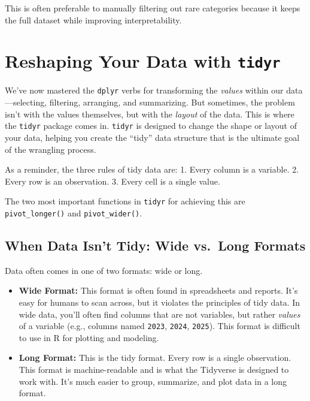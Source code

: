 \documentclass[
  11pt,
]{article}
\begin{document}
This is often preferable to manually filtering out rare categories
because it keeps the full dataset while improving interpretability.

\section{\texorpdfstring{Reshaping Your Data with
\texttt{tidyr}}{Reshaping Your Data with tidyr}}\label{reshaping-your-data-with-tidyr}

We've now mastered the \texttt{dplyr} verbs for transforming the
\emph{values} within our data---selecting, filtering, arranging, and
summarizing. But sometimes, the problem isn't with the values
themselves, but with the \emph{layout} of the data. This is where the
\texttt{tidyr} package comes in. \texttt{tidyr} is designed to change
the shape or layout of your data, helping you create the ``tidy'' data
structure that is the ultimate goal of the wrangling process.

As a reminder, the three rules of tidy data are: 1. Every column is a
variable. 2. Every row is an observation. 3. Every cell is a single
value.

The two most important functions in \texttt{tidyr} for achieving this
are \texttt{pivot\_longer()} and \texttt{pivot\_wider()}.

\subsection{When Data Isn't Tidy: Wide vs.~Long
Formats}\label{when-data-isnt-tidy-wide-vs.-long-formats}

Data often comes in one of two formats: wide or long.

\begin{itemize}
\item
  \textbf{Wide Format:} This format is often found in spreadsheets and
  reports. It's easy for humans to scan across, but it violates the
  principles of tidy data. In wide data, you'll often find columns that
  are not variables, but rather \emph{values} of a variable (e.g.,
  columns named \texttt{2023}, \texttt{2024}, \texttt{2025}). This
  format is difficult to use in R for plotting and modeling.
\item
  \textbf{Long Format:} This is the tidy format. Every row is a single
  observation. This format is machine-readable and is what the Tidyverse
  is designed to work with. It's much easier to group, summarize, and
  plot data in a long format.
\end{itemize}
\end{document}
